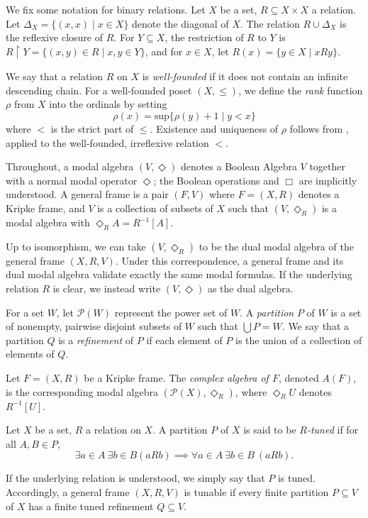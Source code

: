 \documentclass[submission]{eptcs}
\begin{document}
We fix some notation for binary relations. Let $X$ be a set, $R\subseteq X \times X$ a relation.
Let $\Delta_X=\{(x,x) \mid x \in X\}$ denote the diagonal of $X$. The relation $R \cup \Delta_X$ is the reflexive closure of $R$.
For $Y\subseteq X$, the restriction of $R$ to $Y$ is $R \restriction Y = \{(x,y) \in R \mid x,y \in Y\}$,
and for $x \in X$, let $R(x)=\{y \in X \mid xRy\}$.
\par
We say that a relation $R$ on $X$ is \textit{well-founded} if it does not contain an infinite descending chain.
For a well-founded poset $(X,\leq)$, we define the \textit{rank} function $\rho$ from $X$ into the ordinals by setting
\[
\rho(x)=\text{sup}\{\rho(y)+1\mid y < x\}
\]
where $<$ is the strict part of $\leq$. 
Existence and uniqueness of $\rho$ follows from \cite{Jech_2002}, applied to the well-founded, irreflexive relation $<$.
\par
Throughout, a modal algebra $(V,\Diamond)$ denotes a Boolean Algebra $V$ together with a normal modal operator $\Diamond$; the Boolean operations and $\Box$ are implicitly understood.
A general frame is a pair $(F,V)$ where $F=(X,R)$ denotes a Kripke frame, and $V$ is a collection of subsets of $X$ such that $(V,\Diamond_R)$ is a modal algebra with $\Diamond_R A=R^{-1}[A]$.
\par
Up to isomorphism, we can take $(V,\Diamond_R)$ to be the dual modal algebra of the general frame $(X,R,V)$.
Under this correspondence, a general frame and its dual modal algebra validate exactly the same modal formulas. 
If the underlying relation $R$ is clear, we instead write $(V,\Diamond)$ as the dual algebra.
\par
For a set $W$, let $\mathcal{P}(W)$ represent the power set of $W$. A \textit{partition} $P$ of $W$ is a set of nonempty, pairwise disjoint subsets of $W$ such that $\bigcup P =W$. 
    We say that a partition $Q$ is a \textit{refinement} of $P$ if each element of $P$ is the union of a collection of elements of $Q$. 
    \par
    Let $F=(X,R)$ be a Kripke frame. The \textit{complex algebra of $F$}, denoted $A(F)$, is the corresponding modal algebra $(\mathcal{P}(X),\Diamond_R)$, 
    where $\Diamond_R U$ denotes $R^{-1}[U]$. 
    \par
    \smallskip
    \begin{definition}
        Let $X$ be a set, $R$ a relation on $X$. A partition $P$ of $X$ is said to be \textit{$R$-tuned} if for all $A,B \in P$,
        \[
        \exists a \in A \ \exists b \in B (a R b) \implies \forall a \in A\ \exists b \in B \ (aRb).
        \]
    \end{definition}
    If the underlying relation is understood, we simply say that $P$ is tuned.
    Accordingly, a general frame $(X,R,V)$ is tunable if every finite partition $P\subseteq V$ of $X$ has a finite tuned refinement $Q \subseteq V$.
    
\end{document}
